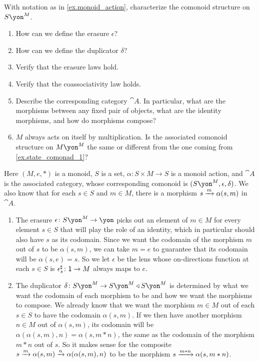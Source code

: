 \documentclass[Book-Poly]{subfiles}
\begin{document}
\begin{exercise}
With notation as in \cref{ex.monoid_action}, characterize the comonoid structure on $S\yon^M$.
\begin{enumerate}
    \item How can we define the erasure $\epsilon$?
    \item How can we define the duplicator $\delta$?
    \item Verify that the erasure laws hold.
    \item Verify that the coassociativity law holds.
    \item Describe the corresponding category $\cat{A}$.
    In particular, what are the morphisms between any fixed pair of objects, what are the identity morphisms, and how do morphisms compose?
	\item $M$ always acts on itself by multiplication. Is the associated comonoid structure on $M\yon^M$ the same or different from the one coming from \cref{ex.state_comonad_1}? %
\qedhere
\end{enumerate}
\begin{solution}
Here $(M,e,*)$ is a monoid, $S$ is a set, $\alpha\colon S\times M\to S$ is a monoid action, and $\cat{A}$ is the associated category, whose corresponding comonoid is $(S\yon^M,\epsilon,\delta)$.
We also know that for each $s\in S$ and $m\in M$, there is a morphism $s\xrightarrow{m} \alpha(s,m)$ in $\cat{A}$.
\begin{enumerate}
    \item The erasure $\epsilon\colon S\yon^M\to\yon$ picks out an element of $m\in M$ for every element $s\in S$ that will play the role of an identity, which in particular should also have $s$ as its codomain.
    Since we want the codomain of the morphism $m$ out of $s$ to be $\alpha(s,m)$, we can take $m=e$ to guarantee that its codomain will be $\alpha(s,e)=s$.
    So we let $\epsilon$ be the lens whose on-directions function at each $s\in S$ is $\epsilon^\sharp_s\colon\textsf{1}\to M$ always maps to $e$.
    \item The duplicator $\delta\colon S\yon^M\to S\yon^M\tri S\yon^M$ is determined by what we want the codomain of each morphism to be and how we want the morphisms to compose.
    We already know that we want the morphism $m\in M$ out of each $s\in S$ to have the codomain $\alpha(s,m)$.
    If we then have another morphism $n\in M$ out of $\alpha(s,m)$, its codomain will be $\alpha(\alpha(s,m),n)=\alpha(s,m*n)$, the same as the codomain of the morphism $m*n$ out of $s$.
    So it makes sense for the composite $s\xrightarrow{m}\alpha(s,m)\xrightarrow{n} \alpha(\alpha(s,m),n)$ to be the morphism $s\xrightarrow{m*n}\alpha(s,m*n)$.

\end{enumerate}
\end{solution}
\end{exercise}
\end{document}
